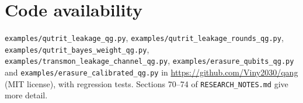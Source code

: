 \documentclass[11pt]{article}
\begin{document}
\section{Code availability}
\sloppy
\texttt{examples/qutrit\_leakage\_qg.py}, \texttt{examples/qutrit\_leakage\_rounds\_qg.py},
\texttt{examples/qutrit\_bayes\_weight\_qg.py}, \texttt{examples/transmon\_leakage\_channel\_qg.py},
\texttt{examples/erasure\_qubits\_qg.py} and \texttt{examples/erasure\_calibrated\_qg.py}
in \url{https://github.com/Viny2030/qang} (MIT license), with regression tests. Sections 70--74 of \texttt{RESEARCH\_NOTES.md} give more detail.



\end{document}
